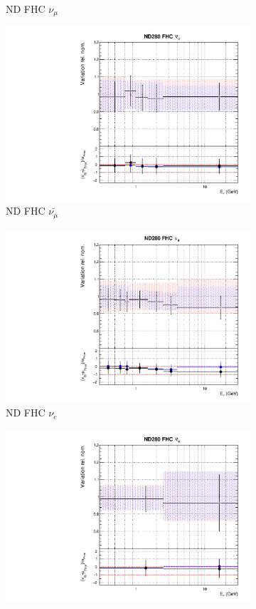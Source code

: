 \begin{figure}[t]
\begin{subfigure}{0.45\textwidth}
  \caption{ND FHC $\nu_{\mu}$}
\end{subfigure}
\begin{subfigure}{0.45\textwidth}
  \centering
  \includegraphics[width=0.75\linewidth]{figs/rhcmpasmvflux1}
  \caption{ND FHC $\bar{\nu_{\mu}}$}
\end{subfigure}
\begin{subfigure}{0.45\textwidth}
  \centering
  \includegraphics[width=0.75\linewidth]{figs/rhcmpasmvflux2}
  \caption{ND FHC $\nu_e$}
\end{subfigure}
\begin{subfigure}{0.45\textwidth}
  \centering
  \includegraphics[width=0.75\linewidth]{figs/rhcmpasmvflux3}

\end{subfigure}
\end{figure}
